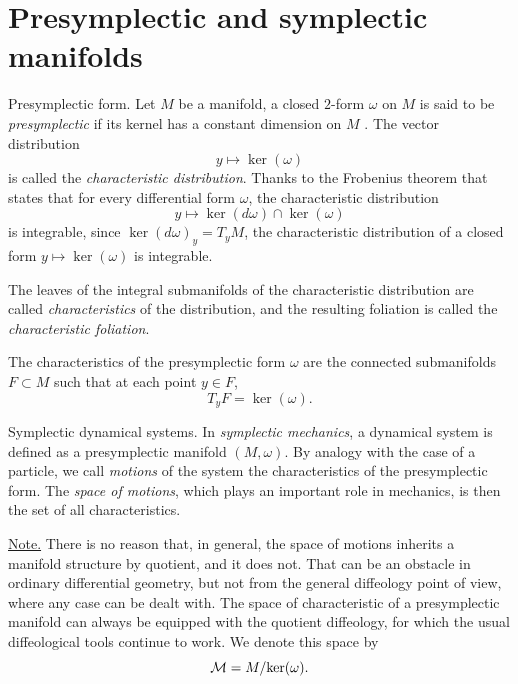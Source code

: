 \section{Presymplectic and symplectic manifolds}

\begin{Article}{Presymplectic form.}{}
  Let $M$ be a manifold,
  a closed $2$-form $\omega$ on $M$ is said to be \emph{presymplectic} if its kernel has a constant dimension on $M$ \cite{Sou70}.
  The vector distribution
  $$%
    y \mapsto \ker(\omega)
    $$%
  is called the \emph{characteristic distribution}.
  Thanks to the Frobenius theorem that states that for every differential form $\omega$,
  the characteristic distribution
  $$%
    y \mapsto \ker(d\omega) \cap \ker(\omega)
    $$%
  is integrable,
  since $\ker(d\omega)_y = T_yM$,
  the characteristic distribution of a  closed form $y \mapsto \ker(\omega)$ is integrable.
  
  The leaves of the integral submanifolds of the characteristic distribution are called \emph{characteristics} of the distribution,
  and the resulting foliation is called the \emph{characteristic foliation}.
  
  The characteristics of the presymplectic form $\omega$ are the connected submanifolds $F \subset M$ such that at each point $y \in F$,
  $$%
    T_yF = \ker(\omega).
    $$%
\end{Article}

\begin{Article}{Symplectic dynamical systems.}{}
  In \emph{symplectic mechanics},
  a dynamical system is defined as a presymplectic manifold $(M,\omega)$.
  By analogy with the case of a particle,
  we call \emph{motions} of the system the characteristics of the presymplectic form.
  The \emph{space of motions},
  which plays an important role in mechanics,
  is then the set of all characteristics.
  
  \uline{Note.} There is no reason that,
  in general,
  the space of motions inherits a manifold structure by quotient,
  and it does not.
  That can be an obstacle in ordinary differential geometry,
  but not from the general diffeology point of view,
  where any case can be dealt with.
  The space of characteristic of a presymplectic manifold can always be equipped with the quotient diffeology,
  for which the usual diffeological tools continue to work.
  We denote this space by
  $$%
    \cM = M/ \ker(\omega).
    $$%
\end{Article}

